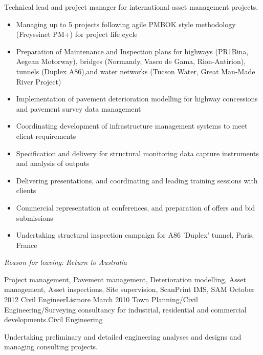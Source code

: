 \begin{experiences}
      {Technical lead and project manager for international asset management projects.
                      \begin{itemize}
                     \item Managing up to 5 projects following agile PMBOK style methodology (Freyssinet PM+) for project life cycle
		\item Preparation of Maintenance and Inspection plans for highways (PR1Bina, Aegean Motorway), bridges (Normandy, Vasco de Gama, Rion-Antirion), tunnels (Duplex A86),and water networks (Tucson Water, Great Man-Made River Project) 
		\item Implementation of pavement deterioration modelling for highway concessions and pavement survey data management
		\item Coordinating development of infrastructure management systems to meet client requirements
   		\item Specification and delivery for structural monitoring data capture instruments and analysis of outputs
		\item Delivering presentations, and coordinating and leading training sessions with clients
		\item Commercial representation at conferences, and preparation of offers and bid submissions
		\item Undertaking structural inspection campaign for A86 'Duplex' tunnel, Paris, France
                      \end{itemize}
                    \textit{Reason for leaving: Return to Australia}
                    }
                    {Project management, Pavement management, Deterioration modelling, Asset management, Asset inspections, Site supervision, ScanPrint IMS, SAM}
  \emptySeparator
  \consultantexperience
  {October 2012}       {Civil Engineer}{}{Lismore}
  {March 2010}      {Town Planning/Civil Engineering/Surveying consultancy for industrial, residential and commercial developments.}{Civil Engineering}
                    {Undertaking preliminary and detailed engineering analyses and designs and managing consulting projects.
           \begin{itemize}


\end{itemize}}
\end{experiences}
